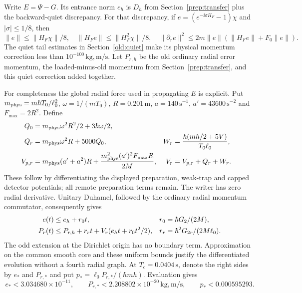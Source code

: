 \documentclass[11pt]{article}
\theoremstyle{definition}\newtheorem{definition}[theorem]{Definition}
\theoremstyle{remark}\newtheorem{remark}[theorem]{Remark}
\begin{document}
Write $E=\Psi-G$.  Its entrance norm $e_h$ is $D_h$ from
Section~\ref{prep:transfer} plus the backward-quiet discrepancy.
For that discrepancy, if $e=(e^{-\ii\sigma H_F}-1)\chi$ and
$|\sigma|\leq1/8$, then
\[
 \|e\|\leq\|H_F\chi\|/8,\quad
 \|H_Fe\|\leq\|H_F^2\chi\|/8,\quad
 \|\partial_re\|^2\leq2m\|e\|(\|H_Fe\|+F_0\|e\|).
\]
The quiet tail estimates in Section~\ref{old:quiet} make its
physical momentum correction less than $10^{-100}\,\mathrm{kg,m/s}$.
Let $P_{r,h}$ be the old ordinary radial error momentum, the
loaded-minus-old momentum from Section~\ref{prep:transfer}, and this
quiet correction added together.

For completeness the global radial force used in propagating $E$ is
explicit.  Put $m_{\rm phys}=m\hbar T_0/\ell_0^2$,
$\omega=1/(mT_0)$, $R=0.201\,\mathrm m$, $a=140\,\mathrm{s}^{-1}$,
$a'=43600\,\mathrm{s}^{-2}$ and $F_{\max}=2R^2$.  Define
\begin{align*}
 Q_0&=m_{\rm phys}\omega^2R^2/2+3\hbar\omega/2,\\
 Q_r&=m_{\rm phys}\omega^2R+5000Q_0,&
 W_r&=\frac{\hbar(mh/2+5V)}{T_0\ell_0},\\
 V_{p,r}&=m_{\rm phys}(a'+a^2)R
          +\frac{m_{\rm phys}^2(a')^2F_{\max}R}{2M},&
 V_r&=V_{p,r}+Q_r+W_r.
\end{align*}
These follow by differentiating the displayed preparation, weak-trap
and capped detector potentials; all remote preparation terms remain.
The writer has zero radial derivative.  Unitary Duhamel, followed by
the ordinary radial momentum commutator, consequently gives
\begin{align}
 e(t)&\leq e_h+r_0t,&r_0&=\hbar G_2/(2M),\notag\\
 P_r(t)&\leq P_{r,h}+r_rt+V_r(e_ht+r_0t^2/2),&
 r_r&=\hbar^2G_{2r}/(2M\ell_0).
 \label{hold:radialerror}
\end{align}
The odd extension at the Dirichlet origin has no boundary term.
Approximation on the common smooth core and these uniform bounds
justify the differentiated evolution without a fourth radial graph.
At $T_c=0.0404\,\mathrm s$, denote the right sides by $e_*$ and
$P_{r,*}$ and put $p_*={\ell_0P_{r,*}}/({\hbar mh})$.
Evaluation gives
\[
 e_*<3.034680\times10^{-11},\qquad
 P_{r,*}<2.208802\times10^{-20}\,\mathrm{kg,m/s},\qquad
 p_*<0.000595293.
\]
\end{document}
